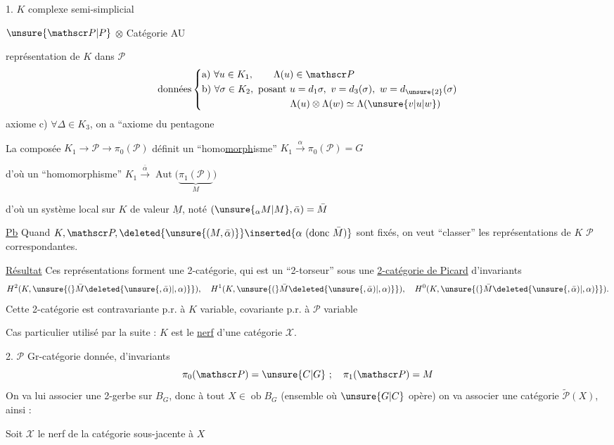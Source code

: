 1. $K$ complexe semi-simplicial

$\unsure{\mathscr P|P}$  $\otimes$ Catégorie AU

représentation \inserted{$\Lambda$} de $K$ dans $\mathscr P$
\[
\text{données}\left\{
\begin{aligned}
&\text{a) }\forall u\in K_1,\qquad\Lambda(u)\in\mathscr P\\
&\text{b) }\forall\sigma\in K_2,\ \text{posant }u=d_1\sigma,\ v=d_3(\sigma),\ w=d_{\unsure{2}}(\sigma)\\
&\hspace{9em}\Lambda(u)\otimes\Lambda(w)\simeq\Lambda(\unsure{v|u|w})
\end{aligned}\right.
\]
axiome \quad c) $\forall\Delta\in K_3$, on a ``axiome du pentagone

La composée \quad $K_1\longrightarrow\mathscr P\longrightarrow\pi_0(\mathscr P)$ définit un ``homo\uline{morph}isme'' \quad $K_1\xrightarrow{\alpha}\pi_0(\mathscr P)=G$

d'où un ``homomorphisme'' \quad $K_1\xrightarrow{\bar\alpha}\operatorname{Aut}\big(\underbrace{\pi_1(\mathscr P)}_{M}\big)$

d'où un système local sur $K$ de valeur $\underline M$, noté $(\unsure{{}_\alpha M|M},\bar\alpha)=\bar M$

\uline{Pb} Quand $K,\mathscr P,\deleted{\unsure{(M,\bar\alpha)}}\inserted{\alpha\ \text{(donc }\bar M\text{)}}$ sont fixés, on veut ``classer'' les représentations de $K$  $\mathscr P$ correspondantes.

\uline{Résultat} Ces représentations forment une 2-catégorie, qui est un ``2-torseur'' sous une \uline{2-catégorie de Picard}  d'invariants
\[
H^2(K,\unsure{(}\bar M\deleted{\unsure{,\bar\alpha)|,\alpha)}}),\quad
H^1(K,\unsure{(}\bar M\deleted{\unsure{,\bar\alpha)|,\alpha)}}),\quad
H^0(K,\unsure{(}\bar M\deleted{\unsure{,\bar\alpha)|,\alpha)}}).
\]
Cette 2-catégorie est contravariante p.r. à $K$ variable,  covariante p.r. à $\mathscr P$ variable

Cas particulier utilisé par la suite : $K$ est le \uline{nerf} d'une catégorie $\mathcal X$. 

2. $\mathscr P$ Gr-catégorie  donnée, d'invariants
\[
\pi_0(\mathscr P)=\unsure{C|G}\ ;\quad\pi_1(\mathscr P)=M
\]
On va lui associer une 2-gerbe  sur $B_G$, donc à tout $X\in\operatorname{ob}B_G$ (ensemble où $\unsure{G|C}$ opère) on va associer une catégorie $\widetilde{\mathscr P}(X)$, ainsi :

Soit $\mathcal X$ le nerf de la catégorie  sous-jacente à $X$
